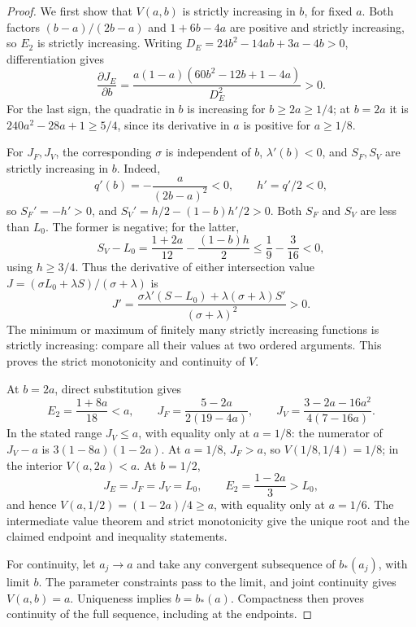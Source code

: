 \begin{proof}
We first show that \(V(a,b)\) is strictly increasing in \(b\), for
fixed \(a\). Both factors \((b-a)/(2b-a)\) and \(1+6b-4a\)
are positive and strictly increasing, so \(E_2\) is strictly increasing.
Writing \(D_E=24b^2-14ab+3a-4b>0\), differentiation gives
\[
 \frac{\partial J_E}{\partial b}
 =\frac{a(1-a)(60b^2-12b+1-4a)}{D_E^2}>0.
\]
For the last sign, the quadratic in \(b\) is increasing for
\(b\ge2a\ge1/4\); at \(b=2a\) it is
\(240a^2-28a+1\ge5/4\), since its derivative in \(a\) is
positive for \(a\ge1/8\).

For \(J_F,J_V\), the corresponding \(\sigma\) is independent of
\(b\), \(\lambda'(b)<0\), and \(S_F,S_V\) are strictly increasing
in \(b\). Indeed,
\[
 q'(b)=-\frac a{(2b-a)^2}<0,\qquad h'=q'/2<0,
\]
so \(S_F'=-h'>0\), and
\(S_V'=h/2-(1-b)h'/2>0\). Both \(S_F\) and \(S_V\) are less
than \(L_0\). The former is negative; for the latter,
\[
 S_V-L_0=\frac{1+2a}{12}-\frac{(1-b)h}{2}
 \le\frac19-\frac3{16}<0,
\]
using \(h\ge3/4\). Thus the derivative of either intersection value
\(J=(\sigma L_0+\lambda S)/(\sigma+\lambda)\) is
\[
 J'=\frac{\sigma\lambda'(S-L_0)+\lambda(\sigma+\lambda)S'}
              {(\sigma+\lambda)^2}>0.
\]
The minimum or maximum of finitely many strictly increasing functions is
strictly increasing: compare all their values at two ordered arguments.
This proves the strict monotonicity and continuity of \(V\).

At \(b=2a\), direct substitution gives
\[
 E_2=\frac{1+8a}{18}<a,\qquad
 J_F=\frac{5-2a}{2(19-4a)},\qquad
 J_V=\frac{3-2a-16a^2}{4(7-16a)}.
\]
In the stated range \(J_V\le a\), with equality only at \(a=1/8\):
the numerator of \(J_V-a\) is
\(3(1-8a)(1-2a)\). At \(a=1/8\), \(J_F>a\), so
\(V(1/8,1/4)=1/8\); in the interior \(V(a,2a)<a\).
At \(b=1/2\),
\[
 J_E=J_F=J_V=L_0,\qquad E_2=\frac{1-2a}{3}>L_0,
\]
and hence \(V(a,1/2)=(1-2a)/4\ge a\), with equality only at
\(a=1/6\). The intermediate value theorem and strict monotonicity
give the unique root and the claimed endpoint and inequality statements.

For continuity, let \(a_j\to a\) and take any convergent subsequence
of \(b_*(a_j)\), with limit \(b\). The parameter constraints pass
to the limit, and joint continuity gives \(V(a,b)=a\). Uniqueness
implies \(b=b_*(a)\). Compactness then proves continuity of the full
sequence, including at the endpoints.
\end{proof}

